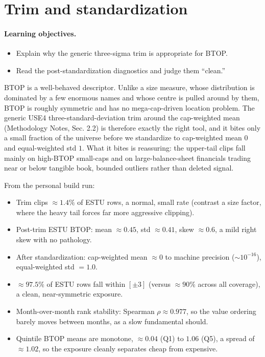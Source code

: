 \documentclass[11pt]{article}
\theoremstyle{definition}
\theoremstyle{plain}
\theoremstyle{remark}
\begin{document}
\section{Trim and standardization}\label{sec:std}

\paragraph{Learning objectives.}
\begin{itemize}[leftmargin=1.4em,nosep]
  \item Explain why the generic three-sigma trim is appropriate for BTOP.
  \item Read the post-standardization diagnostics and judge them ``clean.''
\end{itemize}

BTOP is a well-behaved descriptor. Unlike a size measure, whose distribution is dominated by a few enormous names and whose centre is pulled around by them, BTOP is roughly symmetric and has no mega-cap-driven location problem. The generic USE4 three-standard-deviation trim around the cap-weighted mean (Methodology Notes, Sec. 2.2) is therefore exactly the right tool, and it bites only a small fraction of the universe before we standardize to cap-weighted mean $0$ and equal-weighted std $1$. What it bites is reassuring: the upper-tail clips fall mainly on high-BTOP small-caps and on large-balance-sheet financials trading near or below tangible book, bounded outliers rather than deleted signal.

\begin{observed}
From the personal build run:
\begin{itemize}[leftmargin=1.4em,nosep]
  \item Trim clips $\approx 1.4\%$ of ESTU rows, a normal, small rate (contrast a size factor, where the heavy tail forces far more aggressive clipping).
  \item Post-trim ESTU BTOP: mean $\approx 0.45$, std $\approx 0.41$, skew $\approx 0.6$, a mild right skew with no pathology.
  \item After standardization: cap-weighted mean $\approx 0$ to machine precision ($\sim 10^{-16}$), equal-weighted std $= 1.0$.
  \item $\approx 97.5\%$ of ESTU rows fall within $[\pm 3]$ (versus $\approx 90\%$ across all coverage), a clean, near-symmetric exposure.
  \item Month-over-month rank stability: Spearman $\rho \approx 0.977$, so the value ordering barely moves between months, as a slow fundamental should.
  \item Quintile BTOP means are monotone, $\approx 0.04$ (Q1) to $1.06$ (Q5), a spread of $\approx 1.02$, so the exposure cleanly separates cheap from expensive.
\end{itemize}
\end{observed}
\end{document}
